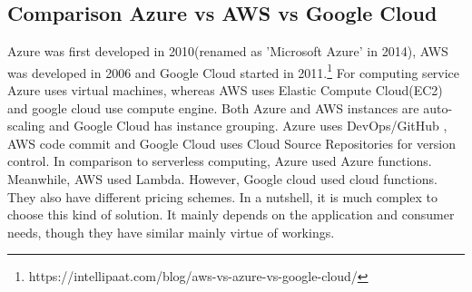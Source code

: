 %
\subsection{Comparison Azure vs AWS vs Google Cloud}
%

Azure was first developed in 2010(renamed as 'Microsoft Azure' in 2014), AWS was developed in 2006 and Google Cloud started in 2011.\footnote{https://intellipaat.com/blog/aws-vs-azure-vs-google-cloud/} For computing service Azure uses virtual machines, whereas AWS uses Elastic Compute Cloud(EC2) and google cloud use compute engine. Both Azure and AWS instances are auto-scaling and Google Cloud has instance grouping\cite{articleComparison}. Azure uses DevOps/GitHub , AWS code commit and Google Cloud uses Cloud Source Repositories for version control. In comparison to serverless computing, Azure used Azure functions.
Meanwhile, AWS used Lambda. However, Google cloud used cloud functions. They also have different pricing schemes. In a nutshell, it is much complex to choose this kind of solution. It mainly depends on the application and consumer needs, though they have similar mainly virtue of workings.  

